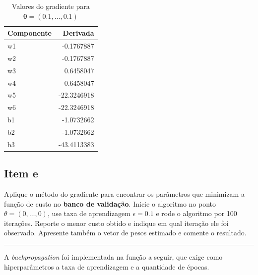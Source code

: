 \documentclass[
  a4paperpaper,
]{article}
\begin{document}
\begin{longtable}[]{@{}lr@{}}

\caption{\label{tbl-gradienteaplicacao}Valores do gradiente para
\(\boldsymbol{\theta} = (0.1, \dots , 0.1)\)}

\tabularnewline

\toprule\noalign{}
Componente & Derivada \\
\midrule\noalign{}
\endhead
\bottomrule\noalign{}
\endlastfoot
w1 & -0.1767887 \\
w2 & -0.1767887 \\
w3 & 0.6458047 \\
w4 & 0.6458047 \\
w5 & -22.3246918 \\
w6 & -22.3246918 \\
b1 & -1.0732662 \\
b2 & -1.0732662 \\
b3 & -43.4113383 \\

\end{longtable}

\subsection{Item e}\label{item-e}

Aplique o método do gradiente para encontrar os parâmetros que minimizam
a função de custo no \textbf{banco de validação}. Inicie o algoritmo no
ponto \(\theta = (0, \dots , 0)\), use taxa de aprendizagem
\(\epsilon = 0.1\) e rode o algoritmo por 100 iterações. Reporte o menor
custo obtido e indique em qual iteração ele foi observado. Apresente
também o vetor de pesos estimado e comente o resultado.

\begin{center}\rule{0.5\linewidth}{0.5pt}\end{center}

A \emph{backpropagation} foi implementada na função a seguir, que exige
como hiperparâmetros a taxa de aprendizagem e a quantidade de épocas.
\end{document}
